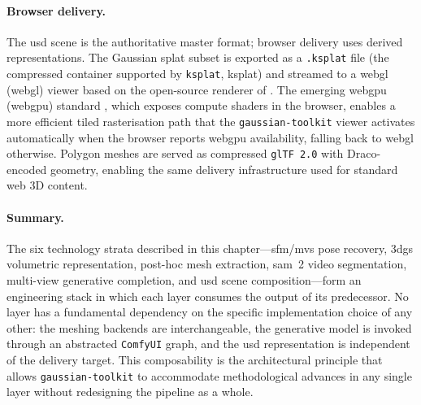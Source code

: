 \paragraph{Browser delivery.}
The \acrshort{usd} scene is the authoritative master format; browser delivery uses
derived representations. The Gaussian splat subset is exported as a \texttt{.ksplat}
file (the compressed container supported by \texttt{ksplat}, \acrshort{ksplat})
and streamed to a \acrlong{webgl} (\acrshort{webgl}) viewer based on the
open-source renderer of \textcite{Antimatter15Splat}. The emerging \acrlong{webgpu}
(\acrshort{webgpu}) standard \parencite{Khronos2024WebGPU}, which exposes
compute shaders in the browser, enables a more efficient tiled rasterisation path
that the \texttt{gaussian-toolkit} viewer activates automatically when the browser
reports \acrshort{webgpu} availability, falling back to \acrshort{webgl} otherwise.
Polygon meshes are served as compressed \texttt{glTF~2.0} with Draco-encoded
geometry, enabling the same delivery infrastructure used for standard web 3D
content.

\paragraph{Summary.}
The six technology strata described in this chapter---\acrshort{sfm}/\acrshort{mvs}
pose recovery, \acrshort{3dgs} volumetric representation, post-hoc mesh extraction,
\acrshort{sam}~2 video segmentation, multi-view generative completion, and
\acrshort{usd} scene composition---form an engineering stack in which each layer
consumes the output of its predecessor. No layer has a fundamental dependency on
the specific implementation choice of any other: the meshing backends are
interchangeable, the generative model is invoked through an abstracted
\texttt{ComfyUI} graph, and the \acrshort{usd} representation is independent of
the delivery target. This composability is the architectural principle that allows
\texttt{gaussian-toolkit} to accommodate methodological advances in any single
layer without redesigning the pipeline as a whole.
